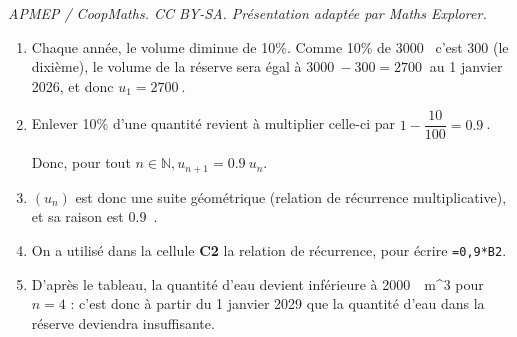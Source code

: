 \documentclass[10pt]{article}
\providecommand{\N}{\mathbb{N}}
\providecommand{\np}[2][]{{#2~#1}}
\begin{document}
\noindent\textit{APMEP / CoopMaths. CC BY-SA. Présentation adaptée par Maths Explorer.}\par\medskip
\begin{enumerate}
  \item 

Chaque année, le volume diminue de 10\%. Comme 10\% de \np{3000} c'est 300 (le dixième), le volume de la réserve sera égal à \mbox{$\np{3000}-300=\np{2700}$} au 1 janvier 2026, et donc \mbox{$u_1=\np{2700}$}.
  \item 

Enlever 10\% d'une quantité revient à multiplier celle-ci par \mbox{$1-\dfrac{10}{100}=\np{0.9}$}.

Donc, pour tout \mbox{$n \in \N, u_{n+1}=\np{0.9}u_n$}.
  \item 

\mbox{$(u_n)$} est donc une suite géométrique (relation de récurrence multiplicative), et sa raison est \np{0.9}.
  \item 





















On a utilisé dans la cellule \textbf{C2} la relation de récurrence, pour écrire \texttt{=0,9*B2}.
  \item 



D'après le tableau, la quantité d'eau devient inférieure à \np[~m^3]{2000} pour \mbox{$n=4$} : c'est donc à partir du 1 janvier 2029 que la quantité d’eau dans la réserve deviendra insuffisante.
\end{enumerate}  

\end{document}
